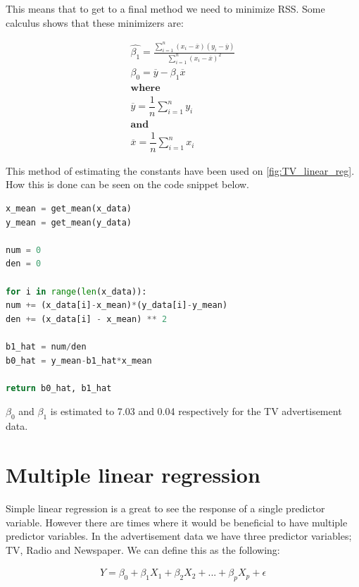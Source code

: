 This means that to get to a final method we need to minimize RSS. Some calculus shows that these minimizers are:

\begin{equation} \label{eq:RSS_e}
\begin{split}
\hat{\beta_1}=\frac{\sum_{i=1}^{n}(x_{i}-\overline{x})(y_{i}-\overline{y})}{\sum_{i=1}^{n}(x_{i}-\overline{x})^{2}} \\
\beta_0=\overline{y}-\beta_1\overline{x} \\
\textbf{where} \\
\overline{y}=\dfrac{1}{n}\sum_{i=1}^{n}y_{i} \\
\textbf{and} \\
\overline{x}=\dfrac{1}{n}\sum_{i=1}^{n}x_{i} 
\end{split}
\end{equation} 

This method of estimating the constants have been used on \cref*{fig:TV_linear_reg}. How this is done can be seen on the code snippet below.

\begin{lstlisting}[language=Python]
x_mean = get_mean(x_data)
y_mean = get_mean(y_data)

num = 0
den = 0

for i in range(len(x_data)):
num += (x_data[i]-x_mean)*(y_data[i]-y_mean)
den += (x_data[i] - x_mean) ** 2

b1_hat = num/den
b0_hat = y_mean-b1_hat*x_mean

return b0_hat, b1_hat
\end{lstlisting}

$\beta_0$ and $\beta_1$ is estimated to 7.03 and 0.04 respectively for the TV advertisement data.

\section{Multiple linear regression}
Simple linear regression is a great to see the response of a single predictor variable. However there are times where it would be beneficial to have multiple predictor variables. In the advertisement data we have three predictor variables; TV, Radio and Newspaper. We can define this as the following:

\begin{equation} \label{eq:Multiple_lin_reg}
\begin{split}
Y = \beta_0 + \beta_1 X_{1} + \beta_2 X_{2}+...+\beta_{p}X_{p}+\epsilon
\end{split}
\end{equation}

